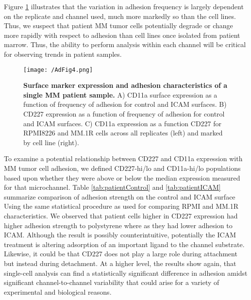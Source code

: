 Figure \ref{figure:AdFig4} illustrates that the variation in adhesion frequency is largely dependent on the replicate and channel used, much more markedly so than the cell lines. Thus, we suspect that patient MM tumor cells potentially degrade or change more rapidly with respect to adhesion than cell lines once isolated from patient marrow. Thus, the ability to perform analysis within each channel will be critical for observing trends in patient samples.

\begin{figure}[ht] %
\centering
\texttt{[image: /AdFig4.png]}
\caption[\textbf{Surface marker expression and adhesion characteristics of a single MM patient sample}]{\textbf{Surface marker expression and adhesion characteristics of a single MM patient sample.} A) CD11a surface expression as a function of frequency of adhesion for control and ICAM surfaces. B) CD227 expression as a function of frequency of adhesion for control and ICAM surfaces. C) CD11a expression as a function CD227 for RPMI8226 and MM.1R cells across all replicates (left) and marked by cell line (right).}
\label{figure:AdFig4}
\end{figure}

To examine a potential relationship between CD227 and CD11a expression with MM tumor cell adhesion, we defined CD227-hi/lo and CD11a-hi/lo populations based upon whether they were above or below the median expression measured for that microchannel. Table \ref{tab:patientControl} and \ref{tab:patientICAM} summarize comparison of adhesion strength on the control and ICAM surface Using the same statistical procedure as used for comparing RPMI and MM.1R characteristics. We observed that patient cells higher in CD227 expression had higher adhesion strength to polystyrene where as they had lower adhesion to ICAM. Although the result is possibly counterintuitive, potentially the ICAM treatment is altering adsorption of an important ligand to the channel substrate. Likewise, it could be that CD227 does not play a large role during attachment but instead during detachment. At a higher level, the results show again, that single-cell analysis can find a statistically significant difference in adhesion amidst significant channel-to-channel variability that could arise for a variety of experimental and biological reasons. 
















